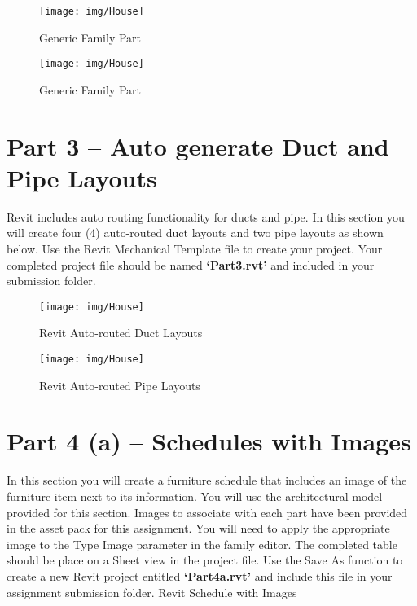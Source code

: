 \begin{figure}[h]
	\centering
	\texttt{[image: img/House]}
	\caption{Generic Family Part}
	\label{fig:GenericFamilyPart}
\end{figure}


\begin{figure}[h]
	\centering
	\texttt{[image: img/House]}
	\caption{Generic Family Part}
	\label{fig:GenericFamilyPart}
\end{figure}

\newpage

\section*{Part 3 – Auto generate Duct and Pipe Layouts}
Revit includes auto routing functionality for ducts and pipe. In this section you will create four (4) auto-routed duct layouts and two pipe layouts as shown below. Use the Revit Mechanical Template file to create your project. Your completed project file should be named \textbf{‘Part3.rvt’} and included in your submission folder.

\begin{figure}[h]
	\centering
	\texttt{[image: img/House]}
	\caption{Revit Auto-routed Duct Layouts}
	\label{fig:AutorouteDuct}
\end{figure}


\begin{figure}[h]
	\centering
	\texttt{[image: img/House]}
	\caption{Revit Auto-routed Pipe Layouts}
	\label{fig:AutoroutePipe}
\end{figure}


\newpage

\section*{Part 4 (a) – Schedules with Images}
In this section you will create a furniture schedule that includes an image of the furniture item next to its information. You will use the architectural model provided for this section. Images to associate with each part have been provided in the asset pack for this assignment. You will need to apply the appropriate image to the Type Image parameter in the family editor. The completed table should be place on a Sheet view in the project file. Use the Save As function to create a new Revit project entitled \textbf{‘Part4a.rvt’} and include this file in your assignment submission folder.
Revit Schedule with Images

